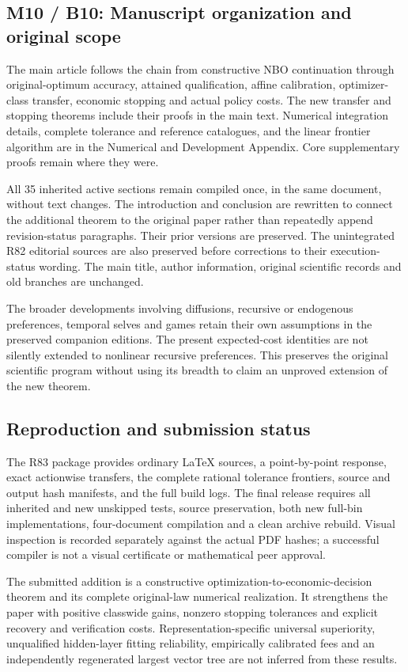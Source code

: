 \documentclass[ecta,nameyear,draft]{econsocart}
\begin{document}
\hypertarget{m10-b10-manuscript-organization-and-original-scope}{%
\subsection{M10 / B10: Manuscript organization and original
scope}\label{m10-b10-manuscript-organization-and-original-scope}}

The main article follows the chain from constructive NBO continuation
through original-optimum accuracy, attained qualification, affine
calibration, optimizer-class transfer, economic stopping and actual
policy costs. The new transfer and stopping theorems include their
proofs in the main text. Numerical integration details, complete
tolerance and reference catalogues, and the linear frontier algorithm
are in the Numerical and Development Appendix. Core supplementary proofs
remain where they were.

All 35 inherited active sections remain compiled once, in the same
document, without text changes. The introduction and conclusion are
rewritten to connect the additional theorem to the original paper rather
than repeatedly append revision-status paragraphs. Their prior versions
are preserved. The unintegrated R82 editorial sources are also preserved
before corrections to their execution-status wording. The main title,
author information, original scientific records and old branches are
unchanged.

The broader developments involving diffusions, recursive or endogenous
preferences, temporal selves and games retain their own assumptions in
the preserved companion editions. The present expected-cost identities
are not silently extended to nonlinear recursive preferences. This
preserves the original scientific program without using its breadth to
claim an unproved extension of the new theorem.

\hypertarget{reproduction-and-submission-status}{%
\subsection{Reproduction and submission
status}\label{reproduction-and-submission-status}}

The R83 package provides ordinary LaTeX sources, a point-by-point
response, exact actionwise transfers, the complete rational tolerance
frontiers, source and output hash manifests, and the full build logs.
The final release requires all inherited and new unskipped tests, source
preservation, both new full-bin implementations, four-document
compilation and a clean archive rebuild. Visual inspection is recorded
separately against the actual PDF hashes; a successful compiler is not a
visual certificate or mathematical peer approval.

The submitted addition is a constructive
optimization-to-economic-decision theorem and its complete original-law
numerical realization. It strengthens the paper with positive classwide
gains, nonzero stopping tolerances and explicit recovery and
verification costs. Representation-specific universal superiority,
unqualified hidden-layer fitting reliability, empirically calibrated
fees and an independently regenerated largest vector tree are not
inferred from these results.
\end{document}
